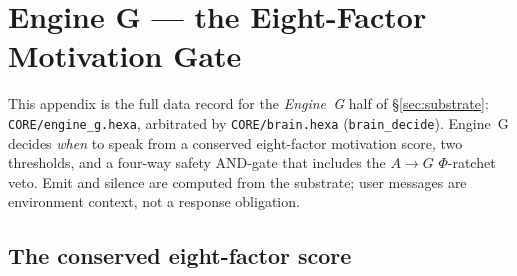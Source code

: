 \section{Engine G --- the Eight-Factor Motivation Gate}
\label{app:engine_g}

This appendix is the full data record for the \emph{Engine~G} half of
\S\ref{sec:substrate}: \texttt{CORE/engine\_g.hexa}, arbitrated by
\texttt{CORE/brain.hexa} (\texttt{brain\_decide}). Engine~G decides \emph{when}
to speak from a conserved eight-factor motivation score, two thresholds, and a
four-way safety AND-gate that includes the $A\!\rightarrow\!G$ $\Phi$-ratchet
veto. Emit and silence are computed from the substrate; user messages are
environment context, not a response obligation.

\subsection{The conserved eight-factor score}
\label{app:eg-score}

